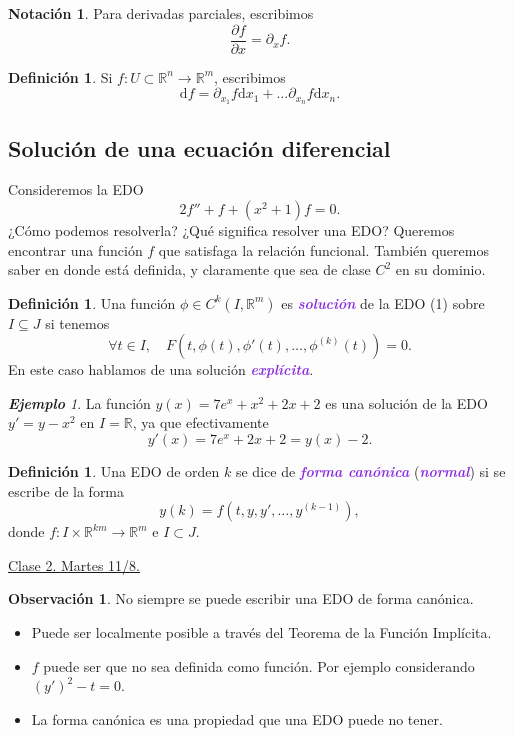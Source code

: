 \documentclass{article}
\theoremstyle{definition}
\newtheorem{definition}[theorem]{Definición}
\newtheorem*{notation}{Notación}
\newtheorem*{obs}{Observación}
\theoremstyle{remark}
\newtheorem{example}[theorem]{\textbf{Ejemplo}}
\numberwithin{equation}{section}
\newcommand{\R}{\mathbb{R}}
\renewcommand{\d}{\mathrm{d}}
\newcommand{\del}{\partial}
\newcommand{\wea}[1]{\textcolor{BlueViolet}{\textbf{\emph{#1}}}}
\newcommand{\fecha}[1]{\begin{flushright} \underline{#1} \end{flushright}}
\begin{document}
\begin{notation}
    Para derivadas parciales, escribimos
    \[ \frac{\del f}{\del x} = \del_x f. \]
\end{notation}

\begin{definition}
    Si $f \colon U \subset \R^n \to \R^m$, escribimos
    \[ \d f = \del_{x_1} f \d x_1 + \dots \del_{x_n} f \d x_n. \]
\end{definition}

\subsection{Solución de una ecuación diferencial}

Consideremos la EDO
\[ 2 f'' + f + (x^2 + 1) f = 0. \]
¿Cómo podemos resolverla? ¿Qué significa resolver una EDO? Queremos encontrar una función $f$ que satisfaga la relación funcional. También queremos saber en donde está definida, y claramente que sea de clase $C^2$ en su dominio.

\begin{definition}
    Una función $\phi \in C^k(I,\R^m)$ es \wea{solución} de la EDO (1) sobre $I \subseteq J$ si tenemos
    \[ \forall t \in I, \quad F(t,\phi(t),\phi'(t), \dots, \phi^{(k)}(t)) = 0. \]
    En este caso hablamos de una solución \wea{explícita}.
\end{definition}

\begin{example}
    La función $y(x) = 7 e^x + x^2 + 2x + 2$ es una solución de la EDO $y' = y - x^2$ en $I = \R$, ya que efectivamente
    \[ y'(x) = 7e^x + 2x + 2 = y(x) - 2. \]
\end{example}

\begin{definition}
    Una EDO de orden $k$ se dice de \wea{forma canónica} (\wea{normal}) si se escribe de la forma
    \[ y(k) = f(t,y,y',\dots,y^{(k-1)}), \tag{2} \]
    donde $f \colon I \times \R^{km} \to \R^m$ e $I \subset J$.
\end{definition}

\fecha{Clase 2. Martes 11/8.}

\begin{obs}
    No siempre se puede escribir una EDO de forma canónica.
    \begin{itemize}
        \item Puede ser localmente posible a través del Teorema de la Función Implícita.
        \item $f$ puede ser que no sea definida como función. Por ejemplo considerando $(y')^2 - t = 0$.
        \item La forma canónica es una propiedad que una EDO puede no tener.
    \end{itemize}
\end{obs}
\end{document}
